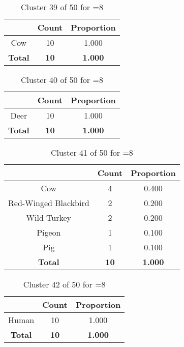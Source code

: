 \begin{table}[ht!]
\centering
\begin{tabular}{|c|c|c|}
\hline
\bf \Spec{} &\bf Count &\bf Proportion\\ \hline \hline
Cow & 10 & 1.000\\ \hline
\hline
\bf Total & \bf 10 & \bf 1.000\\ \hline
\end{tabular}
\label{tab:cluster:39:8}
\caption{Cluster 39 of 50 for \minneigh{}=8}
\end{table}

\clearpage
\begin{table}[ht!]
\centering
\begin{tabular}{|c|c|c|}
\hline
\bf \Spec{} &\bf Count &\bf Proportion\\ \hline \hline
Deer & 10 & 1.000\\ \hline
\hline
\bf Total & \bf 10 & \bf 1.000\\ \hline
\end{tabular}
\label{tab:cluster:40:8}
\caption{Cluster 40 of 50 for \minneigh{}=8}
\end{table}

\begin{table}[ht!]
\centering
\begin{tabular}{|c|c|c|}
\hline
\bf \Spec{} &\bf Count &\bf Proportion\\ \hline \hline
Cow & 4 & 0.400\\ \hline
Red-Winged Blackbird & 2 & 0.200\\ \hline
Wild Turkey & 2 & 0.200\\ \hline
Pigeon & 1 & 0.100\\ \hline
Pig & 1 & 0.100\\ \hline
\hline
\bf Total & \bf 10 & \bf 1.000\\ \hline
\end{tabular}
\label{tab:cluster:41:8}
\caption{Cluster 41 of 50 for \minneigh{}=8}
\end{table}

\begin{table}[ht!]
\centering
\begin{tabular}{|c|c|c|}
\hline
\bf \Spec{} &\bf Count &\bf Proportion\\ \hline \hline
Human & 10 & 1.000\\ \hline
\hline
\bf Total & \bf 10 & \bf 1.000\\ \hline
\end{tabular}
\label{tab:cluster:42:8}
\caption{Cluster 42 of 50 for \minneigh{}=8}
\end{table}

